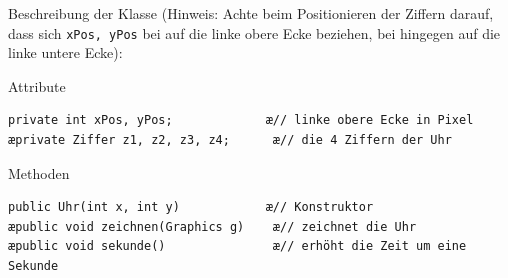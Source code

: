 Beschreibung der Klasse  (Hinweis: Achte beim Positionieren der Ziffern darauf, 
dass sich \lstinline|xPos, yPos| bei  auf die linke obere Ecke beziehen, bei 
 hingegen auf die linke untere Ecke):

\begin{compactenum}[a)]
\item Attribute

\begin{lstlisting}
private int xPos, yPos;             æ// linke obere Ecke in Pixel
æprivate Ziffer z1, z2, z3, z4;      æ// die 4 Ziffern der Uhr
\end{lstlisting}

\item Methoden

\begin{lstlisting}
public Uhr(int x, int y)            æ// Konstruktor
æpublic void zeichnen(Graphics g)    æ// zeichnet die Uhr
æpublic void sekunde()               æ// erhöht die Zeit um eine Sekunde
\end{lstlisting}
\end{compactenum}
